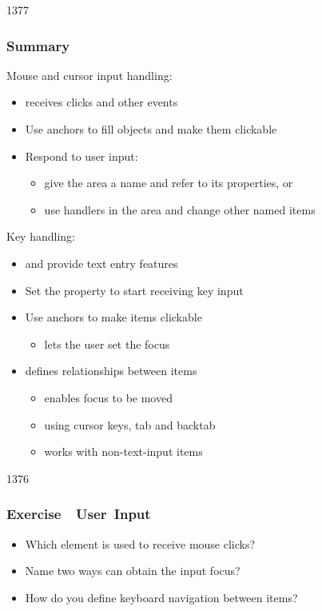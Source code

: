 \begin{slide}{1377}\frametitle{Summary}

Mouse and cursor input handling:

\begin{itemize}
\item {} receives clicks and other events
\item Use anchors to fill objects and make them clickable
\item Respond to user input:
  \begin{itemize}
  \item give the area a name and refer to its properties, or
  \item use handlers in the area and change other named items
  \end{itemize}
\end{itemize}

Key handling:

\begin{itemize}
\item {} and  provide text entry features
\item Set the  property to start receiving key input
\item Use anchors to make items clickable
  \begin{itemize}
  \item lets the user set the focus
  \end{itemize}
\item {} defines relationships between items
  \begin{itemize}
  \item enables focus to be moved
  \item using cursor keys, tab and backtab
  \item works with non-text-input items
  \end{itemize}
\end{itemize}

\end{slide}       


\begin{slide}{1376}\frametitle{Exercise~\textendash~User~Input}

\begin{itemize}
\item Which element is used to receive mouse clicks?
\item Name two ways  can obtain the input focus?
\item How do you define keyboard navigation between items?
\end{itemize}

\end{slide}

